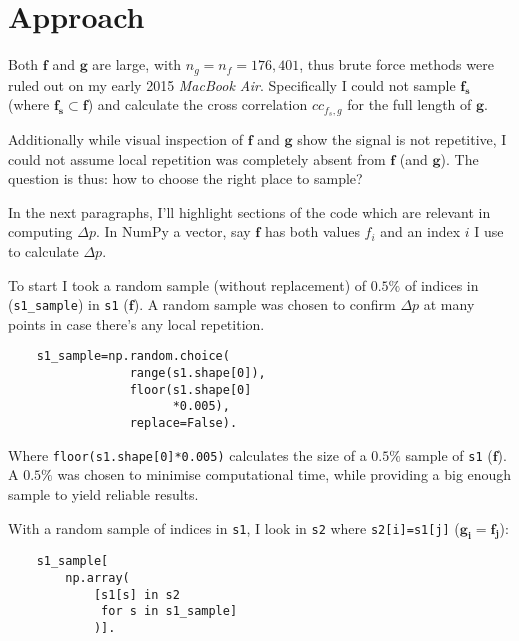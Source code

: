 \documentclass[prb,11pt,twocolumn]{revtex4-1}
\begin{document}

\section{Approach}
Both $\mathbf{f}$ and $\mathbf{g}$ are large, with $n_g = n_f = 176,401$, thus brute force methods were ruled out on my early 2015 \textit{MacBook Air}. Specifically I could not sample $\mathbf{f_s}$ (where $\mathbf{f_s} \subset \mathbf{f}$) and calculate the cross correlation $cc_{f_s,g}$ for the full length of $\mathbf{g}$.

Additionally while visual inspection of $\mathbf{f}$ and $\mathbf{g}$ show the signal is not repetitive, I could not assume local repetition was completely absent from $\mathbf{f}$ (and $\mathbf{g}$). The question is thus: how to choose the right place to sample? 

In the next paragraphs, I'll highlight sections of the code which are relevant in computing $\Delta p$. In NumPy a vector, say $\mathbf{f}$ has both values $f_i$ and an index $i$ I use to calculate $\Delta p$.

To start I took a random sample (without replacement) of $0.5\%$ of indices in (\texttt{s1\_sample}) in \texttt{s1} ($\mathbf{f}$). A random sample was chosen to confirm $\Delta p$ at many points in case there's any local repetition.

\begin{verbatim}
    s1_sample=np.random.choice(
                 range(s1.shape[0]),
                 floor(s1.shape[0]
                       *0.005),
                 replace=False).
\end{verbatim}

Where \texttt{floor(s1.shape[0]*0.005)} calculates the size of a $0.5\%$ sample of \texttt{s1} ($\mathbf{f}$). A $0.5\%$ was chosen to minimise computational time, while providing a big enough sample to yield reliable results. 

With a random sample of indices in \texttt{s1}, I look in \texttt{s2} where \texttt{s2[i]=s1[j]} ($\mathbf{g_i}=\mathbf{f_j}$):

\begin{verbatim}
    s1_sample[
        np.array(
            [s1[s] in s2 
             for s in s1_sample]
            )].
\end{verbatim}
\end{document}
